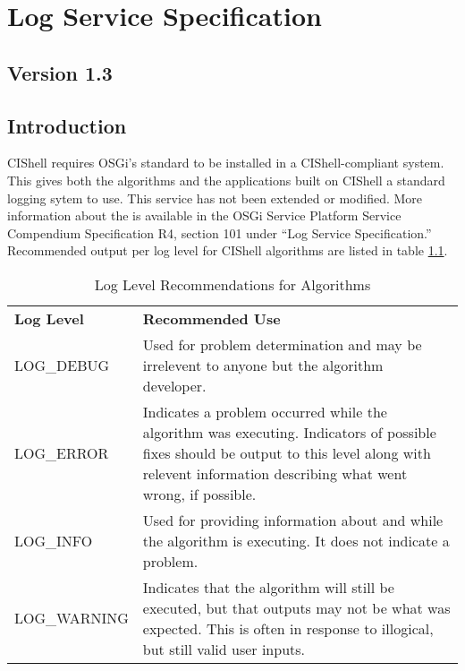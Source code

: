 \chapter{Log Service Specification}
\label{logService}
\section*{Version 1.3}
\section{Introduction}

CIShell requires OSGi's standard  to be installed in a
CIShell-compliant system. This gives both the algorithms and the applications
built on CIShell a standard logging sytem to use. This service has not been
extended or modified. More information about the  is available
in the OSGi Service Platform Service Compendium Specification R4, section 101
under ``Log Service Specification.'' Recommended output per log level for
CIShell algorithms are listed in table \ref{table:logLevels}.

\begin{table}[htb!]
\begin{center}
\begin{tabular}{l p{12cm}}
\textbf{Log Level} & \textbf{Recommended Use} \\
LOG\_DEBUG & Used for problem determination and may be irrelevent to anyone but
the algorithm developer. \\
LOG\_ERROR & Indicates a problem occurred while the algorithm was executing.
Indicators of possible fixes should be output to this level along with
relevent information describing what went wrong, if possible. \\
LOG\_INFO & Used for providing information about and while the algorithm is
executing. It does not indicate a problem. \\
LOG\_WARNING & Indicates that the algorithm will still be executed, but
that outputs may not be what was expected. This is often in response to
illogical, but still valid user inputs.
\end{tabular}
\end{center}
\caption{Log Level Recommendations for Algorithms}
\label{table:logLevels}
\end{table}